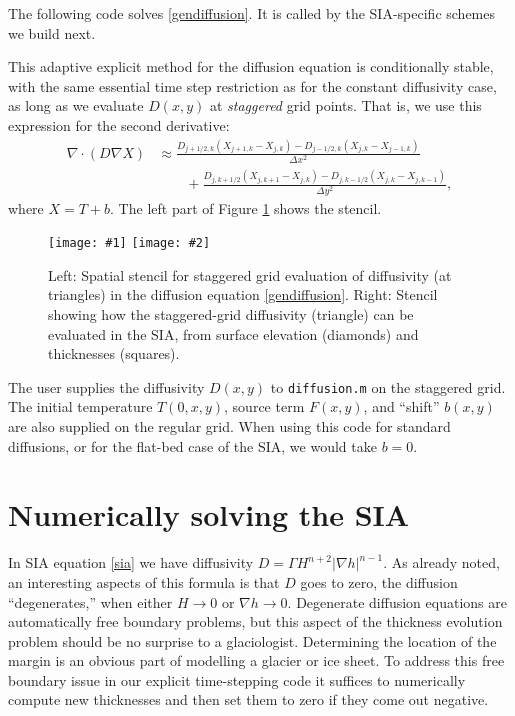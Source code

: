 \documentclass[letterpaper,final,12pt,reqno]{amsart}
\newcommand{\grad}{\nabla}
\newcommand{\Div}{\nabla\cdot}
\newcommand{\minput}[1]{
\vspace{0.8cm}
\VerbatimInput[frame=single,framesep=3mm,label=\fbox{\normalsize \textsl{\,#1.m\,}},fontfamily=courier,fontsize=\footnotesize]{tmp/#1.slim.m}
\vspace{0.5cm}
}
\newcommand{\twofigsizes}[5]{
\begin{figure}[ht]
\centering
\texttt{[image: \#1]} \quad
\texttt{[image: \#2]}
\caption{#3}
\label{fig:#1}
\end{figure}}
\begin{document}
The following code solves \eqref{gendiffusion}.  It is called by the SIA-specific schemes we build next.

\minput{diffusion}

This adaptive explicit method for the diffusion equation is conditionally stable, with the same essential time step restriction as for the constant diffusivity case, as long as we evaluate $D(x,y)$ at \emph{staggered} grid points.  That is, we use this expression for the second derivative:
\begin{align*}
\Div \left(D \grad X\right) &\approx \frac{D_{j+1/2,k}(X_{j+1,k} - X_{j,k}) - D_{j-1/2,k}(X_{j,k} - X_{j-1,k})}{\Delta x^2} \\
	&\qquad + \frac{D_{j,k+1/2}(X_{j,k+1} - X_{j,k}) - D_{j,k-1/2}(X_{j,k} - X_{j,k-1})}{\Delta y^2},
\end{align*}
where $X=T+b$.  The left part of Figure \ref{fig:diffstencil} shows the stencil.

\twofigsizes{diffstencil}{mahaffystencil}{Left:  Spatial stencil for staggered grid evaluation of diffusivity (at triangles) in the diffusion equation \eqref{gendiffusion}.  Right: Stencil showing how the staggered-grid diffusivity (triangle) can be evaluated in the SIA, from surface elevation (diamonds) and thicknesses (squares).}{2.2in}{2.2in}

The user supplies the diffusivity $D(x,y)$ to \texttt{diffusion.m} on the staggered grid.  The initial temperature $T(0,x,y)$, source term $F(x,y)$, and ``shift'' $b(x,y)$ are also supplied on the regular grid.  When using this code for standard diffusions, or for the flat-bed case of the SIA, we would take $b=0$.


\section{Numerically solving the SIA} \label{sec:numericalsia}

In SIA equation \eqref{sia} we have diffusivity $D = \Gamma H^{n+2} |\grad h|^{n-1}$.  As already noted, an interesting aspects of this formula is that $D$ goes to zero, the diffusion ``degenerates,'' when either $H\to 0$ or $\grad h \to 0$.  Degenerate diffusion equations are automatically free boundary problems, but this aspect of the thickness evolution problem should be no surprise to a glaciologist.  Determining the location of the margin is an obvious part of modelling a glacier or ice sheet.  To address this free boundary issue in our explicit time-stepping code it suffices to numerically compute new thicknesses and then set them to zero if they come out negative.
\end{document}

